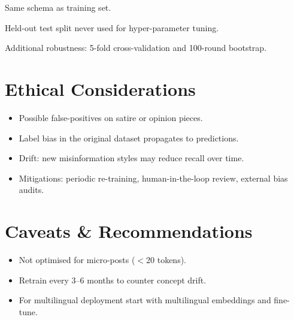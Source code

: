 \documentclass[11pt]{article}
\begin{document}
Same schema as training set.

Held-out test split never used for hyper-parameter tuning.

Additional robustness: 5-fold cross-validation and 100-round bootstrap.

  


\section{Ethical Considerations}

\begin{itemize}[leftmargin=*, label=--]

\item Possible false-positives on satire or opinion pieces.

\item Label bias in the original dataset propagates to predictions.

\item Drift: new misinformation styles may reduce recall over time.

\item Mitigations: periodic re-training, human-in-the-loop review, external bias audits.

\end{itemize}

  


\section{Caveats \& Recommendations}

\begin{itemize}[leftmargin=*, label=--]

\item Not optimised for micro-posts ($<$20 tokens).

\item Retrain every 3–6 months to counter concept drift.

\item For multilingual deployment start with multilingual embeddings and fine-tune.

\end{itemize}

  

\end{document}
